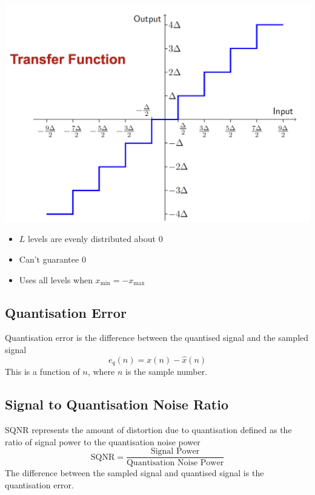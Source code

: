 \documentclass[oneside]{book}
\begin{document}
\begin{itemize}[label=--]
\begin{minipage}[t]{0.35\linewidth}
                        \includegraphics[width=\textwidth]{figures/mid_tread_transfer_function.png}
                    \end{minipage}
                    \begin{minipage}[t]{0.45\linewidth}
                        \begin{itemize}
                            \item $L$ levels are evenly distributed about 0
                            \item Can't guarantee 0
                            \item Uses all levels when $x_{\text{min}} = -x_{\text{max}}$
                        \end{itemize}
                    \end{minipage}
                \end{itemize}
            \subsection{Quantisation Error}
                Quantisation error is the difference between the quantised signal and the sampled signal
                \begin{equation*}
                    e_q(n) = x(n) - \hat{x}(n)
                \end{equation*}
                This is a function of $n$, where $n$ is the sample number.\\
            \subsection{Signal to Quantisation Noise Ratio}
                SQNR represents the amount of distortion due to quantisation defined as the ratio of
                signal power to the quantisation noise power
                \begin{equation*}
                    \text{SQNR} = \frac{\text{Signal Power}}{\text{Quantisation Noise Power}}
                \end{equation*}
                The difference between the sampled signal and quantised signal is the quantisation error.
\end{document}

